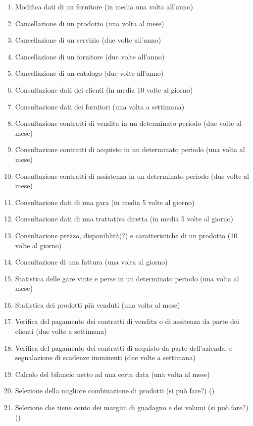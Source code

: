 \begin{enumerate}
  \item Modifica dati di un fornitore (in media una volta all'anno)
  \item Cancellazione di un prodotto (una volta al mese)
  \item Cancellazione di un servizio (due volte all'anno)
  \item Cancellazione di un fornitore (due volte all'anno)
  \item Cancellazione di un catalogo (due volte all'anno)
  \item Consultazione dati dei clienti (in media 10 volte al giorno)
  \item Consultazione dati dei fornitori (una volta a settimana)
  \item Consultazione contratti di vendita in un determinato periodo (due volte al mese)
  \item Consultazione contratti di acquisto in un determinato periodo (una volta al mese)
  \item Consultazione contratti di assistenza in un determinato periodo (due volte al mese)
  \item Consultazione dati di una gara (in media 5 volte al giorno)
  \item Consultazione dati di una trattativa diretta (in media 5 volte al giorno)
  \item Consultazione prezzo, disponiblità(?) e caratteristiche di un prodotto (10 volte al giorno)
  \item Consultazione di una fattura (una volta al giorno)
  \item Statistica delle gare vinte e perse in un determinato periodo (una volta al mese)
  \item Statistica dei prodotti più venduti (una volta al mese)
  \item Verifica del pagamento dei contratti di vendita o di assitenza da parte dei clienti (due volte a settimana)
  \item Verifica del pagamento dei contratti di acquisto da parte dell'azienda, e segnalazione di scadenze imminenti (due volte a settimana)
  \item Calcolo del bilancio netto ad una certa data (una volta al mese)
  \item Selezione della migliore combinazione di prodotti (si può fare?) ()
  \item Selezione che tiene conto dei margini di guadagno e dei volumi (si può fare?) ()

\end{enumerate}
